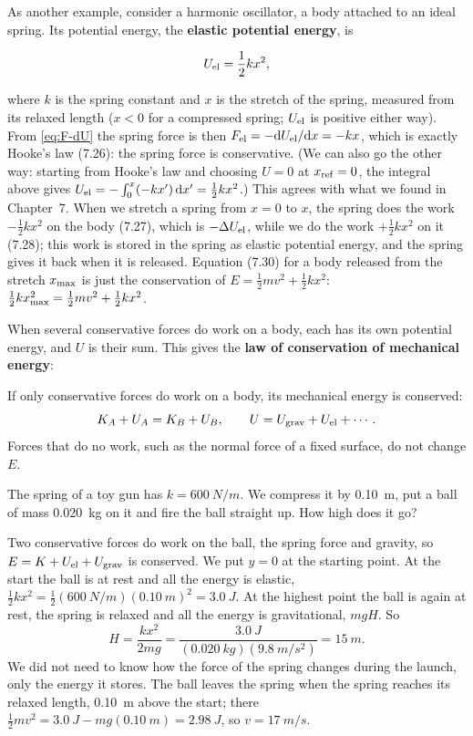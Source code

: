 \documentclass[11pt,a4paper]{article}
\begin{document}
As another example, consider a harmonic oscillator, a body attached to an ideal spring. Its potential
energy, the \textbf{elastic potential energy}, is
\begin{keyresult}
\begin{equation}\label{eq:Uel}
  U_{\mathrm{el}} = \frac12 kx^2 ,
\end{equation}
\end{keyresult}
where $k$ is the spring constant and $x$ is the stretch of the spring, measured from its relaxed
length ($x < 0$ for a compressed spring; $U_{\mathrm{el}}$ is positive either way). From
\eqref{eq:F-dU} the spring force is then $F_{\mathrm{el}} = -\mathrm{d} U_{\mathrm{el}}/\mathrm{d} x = -kx$, which is exactly
Hooke's law \textup{(7.26)}: the spring force is conservative. (We can also go the other way: starting
from Hooke's law and choosing $U = 0$ at $x_{\mathrm{ref}} = 0$, the integral above gives
$U_{\mathrm{el}} = -\int_0^x (-kx')\,\mathrm{d} x' = \frac12 kx^2$.) This agrees with what we found in Chapter~7.
When we stretch a spring from $x = 0$ to $x$, the spring does the work $-\frac12 kx^2$ on the body
\textup{(7.27)}, which is $-\Delta U_{\mathrm{el}}$, while we do the work $+\frac12 kx^2$ on it
\textup{(7.28)}; this work is stored in the spring as elastic potential energy, and the spring gives
it back when it is released. Equation \textup{(7.30)} for a body released from the stretch
$x_{\mathrm{max}}$ is just the conservation of $E = \frac12 mv^2 + \frac12 kx^2$:
$\frac12 kx_{\mathrm{max}}^2 = \frac12 mv^2 + \frac12 kx^2$.

When several conservative forces do work on a body, each has its own potential energy, and $U$ is
their sum. This gives the \textbf{law of conservation of mechanical energy}:
\begin{keyresult}
If only conservative forces do work on a body, its mechanical energy is conserved:
\[
  K_A + U_A = K_B + U_B , \qquad U = U_{\mathrm{grav}} + U_{\mathrm{el}} + \cdots .
\]
Forces that do no work, such as the normal force of a fixed surface, do not change $E$.
\end{keyresult}

\begin{example}
\setlength{\parskip}{0.5em plus 0.1em}%
The spring of a toy gun has $k = \qty{600}{N/m}$. We compress it by \qty{0.10}{m}, put a ball of mass
\qty{0.020}{kg} on it and fire the ball straight up. How high does it go?

Two conservative forces do work on the ball, the spring force and gravity, so $E = K + U_{\mathrm{el}} +
U_{\mathrm{grav}}$ is conserved. We put $y = 0$ at the starting point. At the start the ball is at rest and
all the energy is elastic, $\frac12 kx^2 = \frac12(\qty{600}{N/m})(\qty{0.10}{m})^2 = \qty{3.0}{J}$.
At the highest point the ball is again at rest, the spring is relaxed and all the energy is
gravitational, $mgH$. So
\[
  H = \frac{kx^2}{2mg} = \frac{\qty{3.0}{J}}{(\qty{0.020}{kg})(\qty{9.8}{m/s^2})} = \qty{15}{m} .
\]
We did not need to know how the force of the spring changes during the launch, only the energy it
stores. The ball leaves the spring when the spring reaches its relaxed length, \qty{0.10}{m} above
the start; there $\frac12 mv^2 = \qty{3.0}{J} - mg(\qty{0.10}{m}) = \qty{2.98}{J}$, so
$v = \qty{17}{m/s}$.
\end{example}
\end{document}
